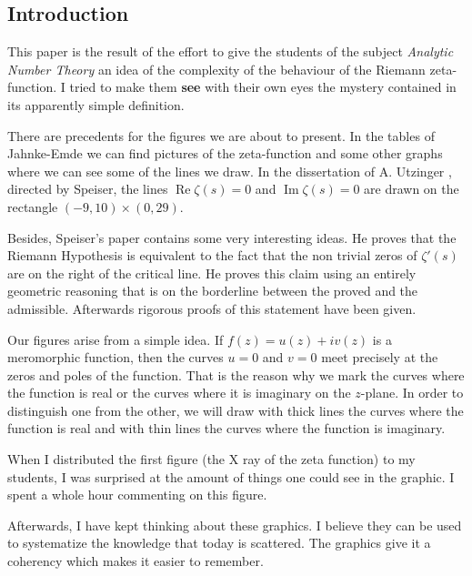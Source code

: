 \documentclass[a4paper]{amsart}
\numberwithin{equation}{section}
\def\Re{\operatorname{\text{Re}}}
\def\Im{\operatorname{\text{Im}}}
\begin{document}
\begin{large}

\section{Introduction} \label{S:intro}


This paper is the result of the effort to give the students of the subject {\sl
Analytic Number Theory} an idea of the complexity of the behaviour of the
Riemann zeta-function. I tried to make them {\bf see} with their own
eyes the mystery contained in its apparently simple definition.

There are precedents for the figures we are about to present. In the tables of
Jahnke-Emde \cite{JE} we can find pictures of the zeta-function and some other graphs
where we can see  some of the lines we draw. 
In the dissertation of A. Utzinger \cite{U}, directed by Speiser, 
the lines $\Re\zeta(s)=0$ and $\Im\zeta(s)=0$ are drawn on the 
rectangle $(-9,10)\times(0,29)$.


Besides, Speiser's paper contains some very interesting ideas. He proves
that the Riemann Hypothesis is equivalent to the fact that the non trivial
zeros of  $\zeta'(s)$ are on the right of the critical line. He
proves this claim using an entirely geometric reasoning that is on the
borderline between the proved and the admissible. Afterwards rigorous proofs of
this statement have been given.
\medskip

Our figures arise from a simple idea. If $f(z)=u(z) + i v(z)$ is a meromorphic
function, then the curves $u=0$ and $v=0$ meet precisely at the zeros and 
poles of the function. That is the reason why we mark the curves where the
function is real or the curves where it is imaginary on the $z$-plane. In order
to distinguish one from the other, we will draw with thick lines the curves
where the function is real and with thin lines the curves where the function is
imaginary.

When I distributed the first figure (the X ray of the zeta function) to my students, I was
surprised at the amount of things one could see in the graphic. I spent a whole
hour commenting on this figure.

Afterwards, I have kept thinking about these graphics. I believe they can be
used to systematize the knowledge that today is scattered. The graphics give
it a coherency which makes it easier to remember.
\goodbreak







\end{large}
\end{document}

